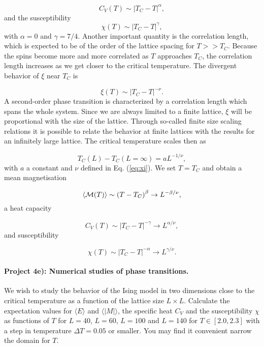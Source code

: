 \documentclass[%
oneside,                 %
final,                   %
10pt]{article}
\begin{document}
\[
  C_V(T) \sim \left|T_C-T\right|^{\alpha},
\]
and the susceptibility
\begin{equation}
  \chi(T) \sim \left|T_C-T\right|^{\gamma},
\end{equation}
with $\alpha = 0$ and $\gamma = 7/4$.
Another important quantity is the correlation length, which is expected
to be of the order of the lattice spacing for $T>> T_C$. Because the spins
become more and more correlated as $T$ approaches $T_C$, the correlation
length increases as we get closer to the critical temperature. The divergent
behavior of $\xi$ near $T_C$ 
is

\begin{equation}
  \xi(T) \sim \left|T_C-T\right|^{-\nu}.
  \label{eq:xi}
\end{equation}
A second-order phase transition is characterized by a
correlation length which spans the whole system.
Since we are always limited to a finite lattice, $\xi$ will
be proportional with the size of the lattice. 
Through so-called finite size scaling relations
it is possible to relate the behavior at finite lattices with the 
results for an infinitely large lattice.
The critical temperature scales then as

\begin{equation}
 T_C(L)-T_C(L=\infty) = aL^{-1/\nu},
 \label{eq:tc}
\end{equation}
with  $a$ a constant and  $\nu$ defined in Eq. (\ref{eq:xi}).
We set $T=T_C$ and obtain a mean magnetisation

\begin{equation}
  \langle {\cal M}(T) \rangle \sim \left(T-T_C\right)^{\beta}
  \rightarrow L^{-\beta/\nu},
  \label{eq:scale1}
\end{equation}
a heat capacity

\begin{equation}
  C_V(T) \sim \left|T_C-T\right|^{-\gamma} \rightarrow L^{\alpha/\nu},
  \label{eq:scale2}
\end{equation}
and susceptibility

\begin{equation}
  \chi(T) \sim \left|T_C-T\right|^{-\alpha} \rightarrow L^{\gamma/\nu}.
  \label{eq:scale3}
\end{equation}


\paragraph{Project 4e): Numerical studies of phase transitions.}
We wish to study the behavior of the Ising model
in two dimensions close to the critical temperature as a function of
the lattice size $L\times L$. Calculate the expectation values for
$\langle E\rangle$ and $\langle \vert M\vert \rangle$, the specific heat
$C_V$ and the susceptibility $\chi$ as functions of $T$ for $L=40$,
$L=60$, $L=100$ and $L=140$ for $T\in [2.0,2.3]$ with a step in
temperature $\Delta T=0.05$ or smaller.  You may find it convenient narrow the domain for $T$. 
\end{document}
